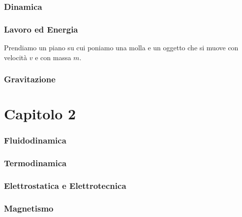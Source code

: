 \documentclass[11pt]{article}
\begin{document}
\section{Dinamica}
\section{Lavoro ed Energia}


Prendiamo un piano su cui poniamo una molla e un oggetto che si muove con velocità $v$ e con massa $m$.



\section{Gravitazione}
\part{Capitolo 2}
\section{Fluidodinamica}

\section{Termodinamica}

\section{Elettrostatica e Elettrotecnica}

\section{Magnetismo}
\end{document}
